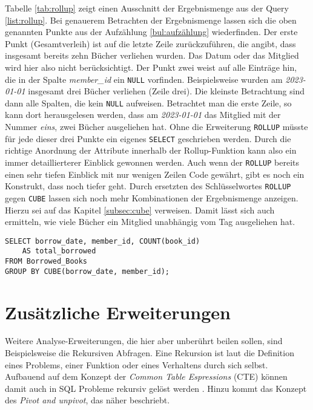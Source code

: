 Tabelle \ref{tab:rollup} zeigt einen Ausschnitt der Ergebnismenge aus der Query
\ref{list:rollup}. Bei genauerem Betrachten der Ergebnismenge lassen sich die oben
genannten Punkte aus der Aufzählung \ref{bul:aufzählung} wiederfinden. Der erste
Punkt (Gesamtverleih) ist auf die letzte Zeile zurückzuführen, die angibt, dass
insgesamt bereits zehn Bücher verliehen wurden. Das Datum oder das Mitglied wird
hier also nicht berücksichtigt. Der Punkt zwei weist auf alle Einträge hin, die in
der Spalte \textit{member\_id} ein \texttt{NULL} vorfinden. Beispielsweise
wurden am \textit{2023-01-01} insgesamt drei Bücher verliehen (Zeile drei). Die
kleinste Betrachtung sind dann alle Spalten, die kein \texttt{NULL} aufweisen. Betrachtet
man die erste Zeile, so kann dort herausgelesen werden, dass am \textit{2023-01-01}
das Mitglied mit der Nummer \textit{eins}, zwei Bücher ausgeliehen hat. Ohne die
Erweiterung \texttt{ROLLUP} müsste für jede dieser drei Punkte ein eigenes
\texttt{SELECT} geschrieben werden. Durch die richtige Anordnung der Attribute
innerhalb der Rollup-Funktion kann also ein immer detaillierterer Einblick
gewonnen werden. Auch wenn der \texttt{ROLLUP} bereits einen sehr tiefen
Einblick mit nur wenigen Zeilen Code gewährt, gibt es noch ein Konstrukt, dass
noch tiefer geht. Durch ersetzten des Schlüsselwortes \texttt{ROLLUP} gegen
\texttt{CUBE} lassen sich noch mehr Kombinationen der Ergebnismenge anzeigen.
Hierzu sei auf das Kapitel \ref{subsec:cube} verweisen. Damit lässt sich auch ermitteln,
wie viele Bücher ein Mitglied unabhängig vom Tag ausgeliehen hat.

\begin{lstlisting}
SELECT borrow_date, member_id, COUNT(book_id)
	AS total_borrowed
FROM Borrowed_Books
GROUP BY CUBE(borrow_date, member_id);
\end{lstlisting}

\section{Zusätzliche Erweiterungen}
\label{sec:zus_erweiterungen} Weitere Analyse-Erweiterungen, die hier aber
unberührt beilen sollen, sind Beispielsweise die Rekursiven Abfragen. Eine
Rekursion ist laut \citet{benecke1998rekursion} die Definition eines Problems,
einer Funktion oder eines Verhaltens durch sich selbst. Aufbauend auf dem Konzept
der \textit{Common Table Espressions} (CTE) können damit auch in SQL Probleme
rekursiv gelöst werden \citep{Ignacio2022}. Hinzu kommt das Konzept des \textit{Pivot
and unpivot}, das \citet{Nuijten2023} näher beschriebt.
